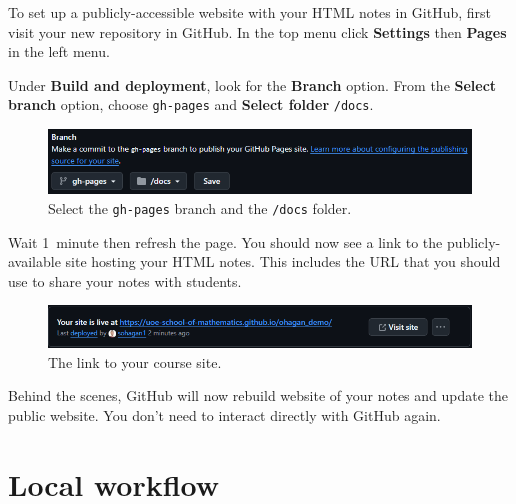 To set up a publicly-accessible website with your HTML notes in GitHub, first visit your new repository in GitHub. In the top menu click \textbf{Settings} then \textbf{Pages} in the left menu.

Under \textbf{Build and deployment}, look for the \textbf{Branch} option. From the \textbf{Select branch} option, choose \texttt{gh-pages} and \textbf{Select folder} \texttt{/docs}.

\begin{figure}[h]
    \centering
    \includegraphics[width=\columnwidth]{img/GitHub-Pages.png}
    \caption{Select the \texttt{gh-pages} branch and the \texttt{/docs} folder.}
    \label{fig:gh-pages}
\end{figure}

Wait 1~minute then refresh the page. You should now see a link to the publicly-available site hosting your HTML notes. This includes the URL that you should use to share your notes with students.

\begin{figure}[h]
    \centering
    \includegraphics[width=\columnwidth]{img/GitHub-site-link.png}
    \caption{The link to your course site.}
    \label{fig:gh-site-link}
\end{figure}

Behind the scenes, GitHub will now rebuild website of your notes and update the public website. You don't need to interact directly with GitHub again. 


\section{Local workflow}

